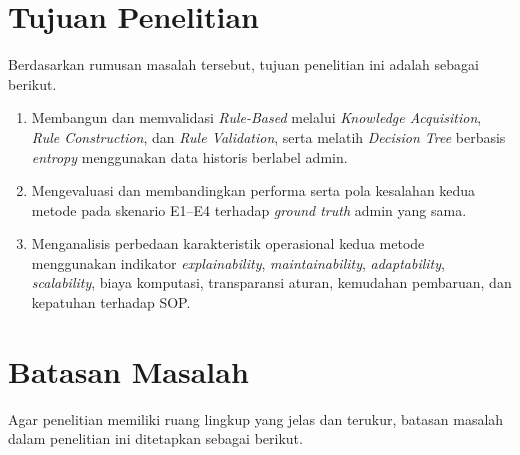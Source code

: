 \section{Tujuan Penelitian}

Berdasarkan rumusan masalah tersebut, tujuan penelitian ini adalah sebagai berikut.

\begin{enumerate}
    \item Membangun dan memvalidasi \textit{Rule-Based} melalui \textit{Knowledge Acquisition}, \textit{Rule Construction}, dan \textit{Rule Validation}, serta melatih \textit{Decision Tree} berbasis \textit{entropy} menggunakan data historis berlabel admin.
    \item Mengevaluasi dan membandingkan performa serta pola kesalahan kedua metode pada skenario E1--E4 terhadap \textit{ground truth} admin yang sama.
    \item Menganalisis perbedaan karakteristik operasional kedua metode menggunakan indikator \textit{explainability}, \textit{maintainability}, \textit{adaptability}, \textit{scalability}, biaya komputasi, transparansi aturan, kemudahan pembaruan, dan kepatuhan terhadap SOP.
\end{enumerate}

\section{Batasan Masalah}

Agar penelitian memiliki ruang lingkup yang jelas dan terukur, batasan masalah dalam penelitian ini ditetapkan sebagai berikut.

